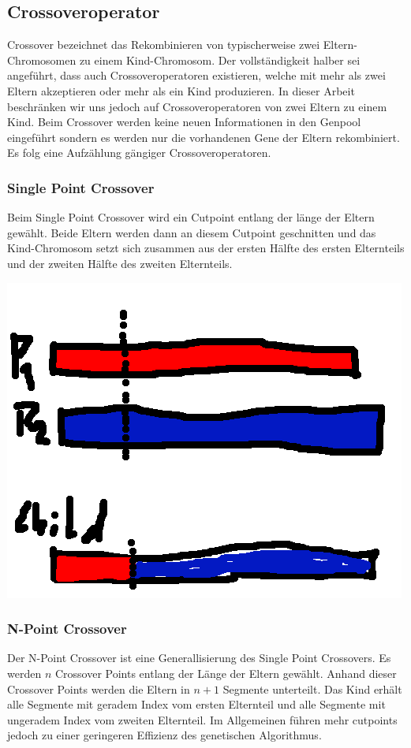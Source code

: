 \subsection{Crossoveroperator}
Crossover bezeichnet das Rekombinieren von typischerweise zwei Eltern-Chromosomen zu einem Kind-Chromosom.
Der vollständigkeit halber sei angeführt, dass auch Crossoveroperatoren existieren, welche 
mit mehr als zwei Eltern akzeptieren oder mehr als ein Kind produzieren. In dieser Arbeit beschränken 
wir uns jedoch auf Crossoveroperatoren von zwei Eltern zu einem Kind.
Beim Crossover werden keine neuen Informationen in den Genpool eingeführt sondern 
es werden nur die vorhandenen Gene der Eltern rekombiniert.
Es folg eine Aufzählung gängiger Crossoveroperatoren.

\subsubsection*{Single Point Crossover}
Beim Single Point Crossover wird ein Cutpoint entlang der länge der Eltern gewählt.
Beide Eltern werden dann an diesem Cutpoint geschnitten und das Kind-Chromosom setzt sich zusammen
aus der ersten Hälfte des ersten Elternteils und der zweiten Hälfte des zweiten Elternteils.

\includegraphics[scale=1.0]{images/Single_Point_Crossover.png}

\subsubsection*{N-Point Crossover}
Der N-Point Crossover ist eine Generallisierung des Single Point Crossovers.
Es werden $n$ Crossover Points entlang der Länge der Eltern gewählt.
Anhand dieser Crossover Points werden die Eltern in $n+1$ Segmente unterteilt.
Das Kind erhält alle Segmente mit geradem Index vom ersten Elternteil und alle Segmente mit 
ungeradem Index vom zweiten Elternteil.
Im Allgemeinen führen mehr cutpoints jedoch zu einer geringeren Effizienz 
des genetischen Algorithmus.~\cite*{TerminologiesAndOperators}

